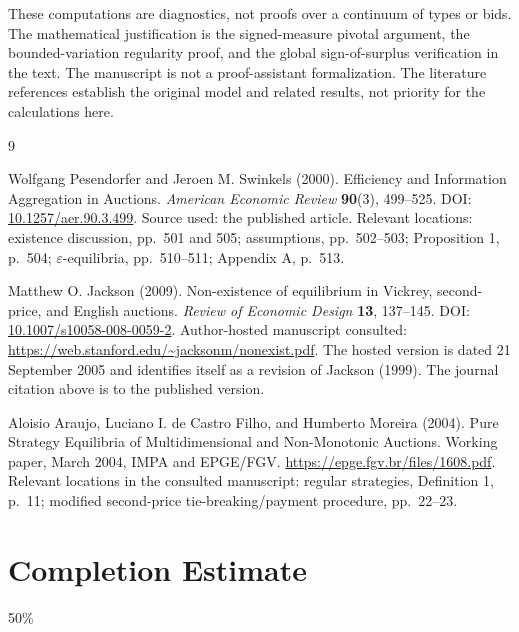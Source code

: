 \documentclass[11pt,a4paper]{article}
\numberwithin{equation}{section}
\theoremstyle{definition}
\theoremstyle{remark}
\begin{document}
These computations are diagnostics, not proofs over a continuum of types or bids. The mathematical justification is the signed-measure pivotal argument, the bounded-variation regularity proof, and the global sign-of-surplus verification in the text. The manuscript is not a proof-assistant formalization. The literature references establish the original model and related results, not priority for the calculations here.

\clearpage
\begin{thebibliography}{9}

Wolfgang Pesendorfer and Jeroen M. Swinkels (2000).
\newblock Efficiency and Information Aggregation in Auctions.
\newblock \emph{American Economic Review} \textbf{90}(3), 499--525.
\newblock DOI: \href{https://doi.org/10.1257/aer.90.3.499}{10.1257/aer.90.3.499}.
\newblock Source used: the published article. Relevant locations: existence discussion, pp.~501 and 505; assumptions, pp.~502--503; Proposition 1, p.~504; $\varepsilon$-equilibria, pp.~510--511; Appendix A, p.~513.

Matthew O. Jackson (2009).
\newblock Non-existence of equilibrium in Vickrey, second-price, and English auctions.
\newblock \emph{Review of Economic Design} \textbf{13}, 137--145.
\newblock DOI: \href{https://doi.org/10.1007/s10058-008-0059-2}{10.1007/s10058-008-0059-2}.
\newblock Author-hosted manuscript consulted:
\url{https://web.stanford.edu/~jacksonm/nonexist.pdf}.
\newblock The hosted version is dated 21 September 2005 and identifies itself as a revision of Jackson (1999). The journal citation above is to the published version.

Aloisio Araujo, Luciano I. de Castro Filho, and Humberto Moreira (2004).
\newblock Pure Strategy Equilibria of Multidimensional and Non-Monotonic Auctions.
\newblock Working paper, March 2004, IMPA and EPGE/FGV.
\newblock \url{https://epge.fgv.br/files/1608.pdf}.
\newblock Relevant locations in the consulted manuscript: regular strategies, Definition 1, p.~11; modified second-price tie-breaking/payment procedure, pp.~22--23.

\end{thebibliography}
\section{Completion Estimate}
50\%
\end{document}
